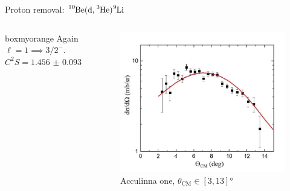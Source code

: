 \documentclass[sans,
frameno, %
mp,
usenames,dvipsnames, %
onlytextwidth, %
t,%
11pt]{beamer}
\newcommand{\iso}[2]{\ce{^{#1}#2}}
\begin{document}
\begin{frame}{Proton removal: $\iso{10}{Be}(\textrm{d}, \iso{3}{He})\iso{9}{Li}$}
\begin{columns}[t]
{            \medskip
            \hfill
            \begin{beamercolorbox}[sep=1ex,center, rounded=true, wd=0.95\linewidth]{boxmyorange}
                Again $\ell = 1 \implies 3/2^{-}$. \\
                $C^2S = \qty{1.456(93)}{}$
            \end{beamercolorbox}
            \hfill
        }
        \hfill
        {
            {
                \begin{figure}
                    \centering
                    \captionsetup{belowskip=3.5pt}
                    \caption{Acculinna one, $\theta_{\textrm{CM}} \in \left[3, 13\right]\unit{\degree}$}
                    \includegraphics[width=0.8\linewidth, cfbox=Mulberry 1pt 0pt 0pt]{figures/acculina_xs.png}%
                \end{figure}

}}
\end{columns}
\end{frame}
\end{document}
